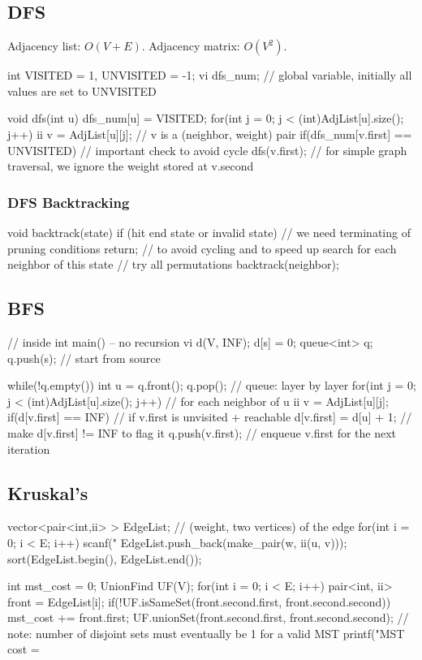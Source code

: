 \documentclass{article}
\begin{document}
\subsection{DFS}
Adjacency list: \(O(V + E)\). Adjacency matrix: \(O(V^2)\).
\begin{mylisting}{}
int VISITED = 1, UNVISITED = -1;
vi dfs_num;	// global variable, initially all values are set to UNVISITED

void dfs(int u){
	dfs_num[u] = VISITED;
	for(int j = 0; j < (int)AdjList[u].size(); j++){
			ii v = AdjList[u][j];	// v is a (neighbor, weight) pair
			if(dfs_num[v.first] == UNVISITED)	// important check to avoid cycle
				dfs(v.first);
	}	// for simple graph traversal, we ignore the weight stored at v.second
}
\end{mylisting}

\subsubsection{DFS Backtracking}
\begin{mylisting}{}
void backtrack(state){
	if (hit end state or invalid state)	// we need terminating of pruning conditions
		return;	// to avoid cycling and to speed up search
	for each neighbor of this state	// try all permutations
		backtrack(neighbor);
}
\end{mylisting}

\subsection{BFS}
\begin{mylisting}{}
// inside int main() -- no recursion
vi d(V, INF); d[s] = 0;
queue<int> q; q.push(s); // start from source

while(!q.empty()){
	int u = q.front(); q.pop();	// queue: layer by layer
	for(int j = 0; j < (int)AdjList[u].size(); j++){ // for each neighbor of u
		ii v = AdjList[u][j];
		if(d[v.first] == INF){ // if v.first is unvisited + reachable
			d[v.first] = d[u] + 1;	// make d[v.first] != INF to flag it
			q.push(v.first);	// enqueue v.first for the next iteration
		}
	}
}
\end{mylisting}

\subsection{Kruskal's}
\begin{mylisting}{}
vector<pair<int,ii> > EdgeList;	// (weight, two vertices) of the edge
for(int i = 0; i < E; i++){
	scanf("%
	EdgeList.push_back(make_pair(w, ii(u, v)));
}
sort(EdgeList.begin(), EdgeList.end());

int mst_cost = 0;
UnionFind UF(V);
for(int i = 0; i < E; i++){
	pair<int, ii> front = EdgeList[i];
	if(!UF.isSameSet(front.second.first, front.second.second)){
		mst_cost += front.first;
		UF.unionSet(front.second.first, front.second.second);
	}
} // note: number of disjoint sets must eventually be 1 for a valid MST
printf("MST cost = %
\end{mylisting}
\end{document}
